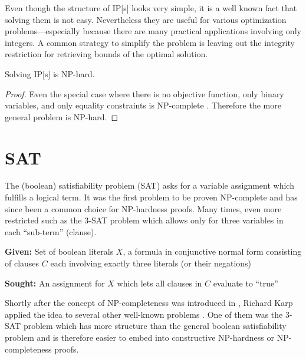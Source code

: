 Even though the structure of \gls{IP}[s] looks very simple, it is a
well known fact that solving them is not easy. Nevertheless they are
useful for various optimization problems---especially because there
are many practical applications involving only integers. A common
strategy to simplify the problem is leaving out the integrity
restriction for retrieving bounds of the optimal solution.

\begin{theorem}
  Solving \gls{IP}[s] is NP-hard.
  \begin{proof}
  Even the special case where there is no objective function, only
  binary variables, and only equality constraints is NP-complete
  \cite{karp_np_complete}. 
  Therefore the more general problem is NP-hard.
  \end{proof}
\end{theorem}

\section{SAT}
The (boolean) satisfiability problem (SAT) asks for a variable
assignment which fulfills a logical term. It was the first problem to
be proven NP-complete \cite{np_complete} and has since been a common
choice for NP-hardness proofs. Many times, even more restricted such
as the 3-SAT problem which allows only for three variables in each
``sub-term'' (clause).

\begin{problem}[3-SAT]
  \label{prob:3SAT}\hfill
  \begin{labeling}{\hspace{4em}}
    \item[\textbf{Given:}]
      Set of boolean literals \(X\), a formula in conjunctive 
      normal form consisting of clauses \(C\) each involving 
      exactly three literals (or their negations)
    \item[\textbf{Sought:}]
      An assignment for \(X\) which lets all clauses in \(C\) evaluate
      to ``true''
  \end{labeling}
\end{problem}

Shortly after the concept of NP-completeness was introduced in
\cite{np_complete}, Richard Karp applied the idea to several other
well-known problems \cite{karp_np_complete}. One of them was the
3-SAT problem which has more structure than the general boolean
satisfiability problem and is therefore easier to embed into
constructive NP-hardness or NP-completeness proofs.

